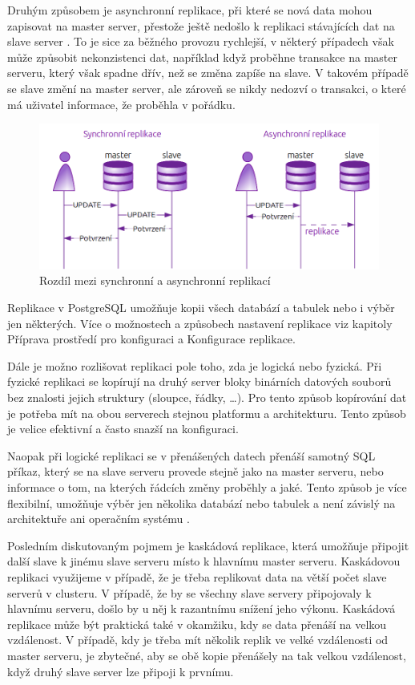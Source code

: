 Druhým způsobem je asynchronní replikace, při které se nová data mohou zapisovat na master server, přestože ještě nedošlo k replikaci stávajících dat na slave server \citep{ObeHsu2012}. To je sice za běžného provozu rychlejší, v některý případech však může způsobit nekonzistenci dat, například když proběhne transakce na master serveru, který však spadne dřív, než se změna zapíše na slave. V takovém případě se slave změní na master server, ale zároveň se nikdy nedozví o transakci, o které má uživatel informace, že proběhla v pořádku. 

        \begin{figure}[H]
          \centering
          \includegraphics[scale=1]{../../../grafy/obr/schema_asyncSync.png}
          \caption {Rozdíl mezi synchronní a asynchronní replikací}
        \end{figure}
Replikace v PostgreSQL umožňuje kopii všech databází a tabulek nebo i výběr jen některých. Více o možnostech a způsobech nastavení replikace viz kapitoly  Příprava prostředí pro konfiguraci a  Konfigurace replikace.

Dále je možno rozlišovat replikaci pole toho, zda je logická nebo fyzická. Při fyzické replikaci se kopírují na druhý server bloky binárních datových souborů bez znalosti jejich struktury (sloupce, řádky, …). Pro tento způsob kopírování dat je potřeba mít na obou serverech stejnou platformu a architekturu. Tento způsob je velice efektivní a často snazší na konfiguraci. 

Naopak při logické replikaci se v přenášených datech přenáší samotný SQL příkaz, který se na slave serveru provede stejně jako na master serveru, nebo informace o tom, na kterých řádcích změny proběhly a jaké. Tento způsob je více flexibilní, umožňuje výběr jen několika databází nebo tabulek a není závislý na architektuře ani operačním systému \citep{Boszormenyi2013}. 

Posledním diskutovaným pojmem je kaskádová replikace, která umožňuje připojit další slave k jinému slave serveru místo k hlavnímu master serveru. Kaskádovou replikaci využijeme v případě, že je třeba replikovat data na větší počet slave serverů v clusteru. V případě, že by se všechny slave servery připojovaly k hlavnímu serveru, došlo by u něj k razantnímu snížení jeho výkonu. Kaskádová replikace může být praktická také v okamžiku, kdy se data přenáší na velkou vzdálenost. V případě, kdy je třeba mít několik replik ve velké vzdálenosti od master serveru, je zbytečné, aby se obě kopie přenášely na tak velkou vzdálenost, když druhý slave server lze připoji k prvnímu. 

